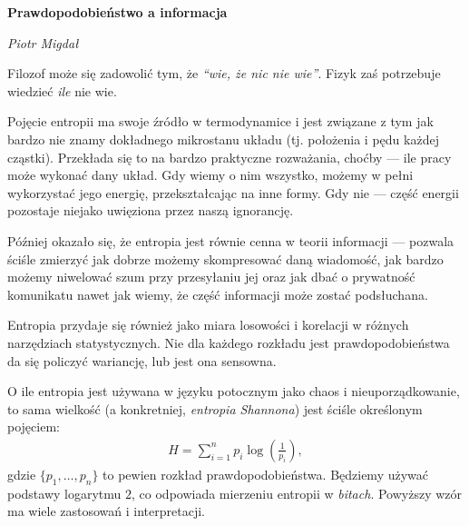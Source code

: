 \documentclass[10pt,a4paper]{article}
\begin{document}
\noindent\textbf{\LARGE Prawdopodobieństwo a informacja}

\medskip
\noindent\textit{\Large Piotr Migdał}

\medskip

Filozof może się zadowolić tym, że \emph{``wie, że nic nie wie''}.
Fizyk zaś potrzebuje wiedzieć \emph{ile} nie wie.

Pojęcie entropii ma swoje źródło w termodynamice i jest związane z tym jak bardzo nie znamy dokładnego mikrostanu układu (tj. położenia i pędu każdej cząstki).
Przekłada się to na bardzo praktyczne rozważania, choćby --- ile pracy może wykonać dany układ.
Gdy wiemy o nim wszystko, możemy w pełni wykorzystać jego energię, przekształcając na inne formy.
Gdy nie --- część energii pozostaje niejako uwięziona przez naszą ignorancję.

Później okazało się, że entropia jest równie cenna w teorii informacji --- pozwala ściśle zmierzyć jak dobrze możemy skompresować daną wiadomość, jak bardzo możemy niwelować szum przy przesyłaniu jej oraz jak dbać o prywatność komunikatu nawet jak wiemy, że część informacji może zostać podsłuchana.

Entropia przydaje się również jako miara losowości i korelacji w różnych narzędziach statystycznych.
Nie dla każdego rozkładu jest prawdopodobieństwa da się policzyć wariancję, lub jest ona sensowna. 

O ile entropia jest używana w języku potocznym jako chaos i nieuporządkowanie, to sama wielkość (a konkretniej, \emph{entropia Shannona}) jest ściśle określonym pojęciem:
%
%
\begin{align}
    H = \sum_{i=1}^{n} p_i \log \left(\tfrac{1}{p_i} \right),\label{eq:entropia}
\end{align}
%
%
gdzie $\{p_1, \ldots, p_n\}$ to pewien rozkład prawdopodobieństwa.
Będziemy używać podstawy logarytmu $2$, co odpowiada mierzeniu entropii w \emph{bitach}.
Powyższy wzór ma wiele zastosowań i interpretacji.
\end{document}
